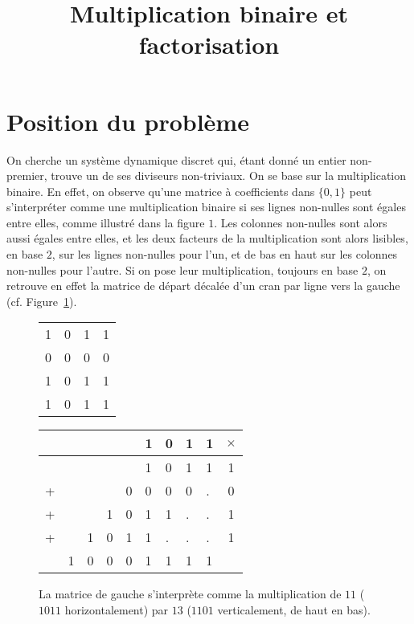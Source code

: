 \documentclass[11pt, openany]{article}
\begin{document}
\renewcommand{\labelitemi}{$\bullet$}

\title{Multiplication binaire et factorisation}
\date{}
\author{}
\maketitle



\section*{Position du problème}


On cherche un système dynamique discret qui, étant donné un entier non-premier, trouve un de ses diviseurs non-triviaux. On se base sur la multiplication binaire. En effet, on observe qu'une matrice à coefficients dans $\{0,1\}$ peut s'interpréter comme une multiplication binaire si ses lignes non-nulles sont égales entre elles, comme illustré dans la figure $1$. Les colonnes non-nulles sont alors aussi égales entre elles, et les deux facteurs de la multiplication sont alors lisibles, en base $2$, sur les lignes non-nulles pour l'un, et de bas en haut sur les colonnes non-nulles pour l'autre. Si on pose leur multiplication, toujours en base $2$, on retrouve en effet la matrice de départ décalée d'un cran par ligne vers la gauche (cf. Figure~\ref{fig:ExShift}).




\begin{figure}[h]
\centering
\begin{minipage}[]{0.25\linewidth}

\begin{tabular}{cccc}
1&0&1&1\\
0&0&0&0\\
1&0&1&1\\
1&0&1&1\\
\end{tabular}

\end{minipage}
\quad
\begin{minipage}[]{0.4\linewidth}


\begin{tabular}{lllllllll|c}
&&&&&1&0&1&1&$\times$\\
\hline
&&&&&1&0&1&1&1\\
+&&&&0&0&0&0&.&0 \\
+&&&1&0&1&1&.&.&1\\
+&&1&0&1&1&.&.&.&1\\
\hline
&1&0&0&0&1&1&1&1&\\
\end{tabular}
\end{minipage}
\caption{La matrice de gauche s'interprète comme la multiplication de $11$ ($1011$ horizontalement) par $13$ ($1101$ verticalement, de haut en bas).}
\label{fig:ExShift}
\end{figure}
\end{document}
